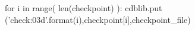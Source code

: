 \documentclass[12pt]{cdblatex}
\begin{document}
\clearpage


\bgroup
{}
\begin{cadabra}
   for i in range( len(checkpoint) ):
      cdblib.put ('check{:03d}'.format(i),checkpoint[i],checkpoint_file)
\end{cadabra}
\egroup
\end{document}
